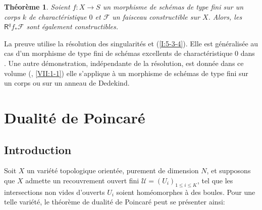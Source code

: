 \documentclass{book}
\newcommand{\cF}{\mathcal{F}}
\newcommand{\sU}{\mathscr{U}}
\newcommand{\R}{\mathsf{R}}
\newtheorem{theorem}[subsubsection]{Théorème}
\begin{document}
\begin{theorem}\label{I:5-3-7} %
Soient $f:X\to S$ un morphisme de schémas de type fini sur un corps $k$ de 
charactéristique $0$ et $\cF$ un faisceau constructible sur $X$. Alors, les 
$\R^q f_* \cF$ sont également constructibles.
\end{theorem}

La preuve utilise la résolution des singularités et (\ref{I:5-3-4}). Elle est 
généralisée au cas d'un morphisme de type fini de schémas excellents de 
charactéristique $0$ dans \cite[XIX.5]{4}. Une autre démonstration, 
indépendante de la résolution, est donnée dans ce volume 
(, \ref{VII:1-1}) 
elle s'applique à un morphisme de schémas de type fini sur un corps ou sur 
un anneau de Dedekind. 




















\section{Dualité de Poincaré}










\subsection{Introduction}\label{I:6-1}

Soit $X$ un variété topologique orientée, purement de dimension $N$, et 
supposons que $X$ admette un recouvrement ouvert fini 
$\sU=(U_i)_{1\leqslant i\leqslant K}$, tel que les intersections non vides 
d'ouverts $U_i$ soient homéomorphes à des boules. Pour une telle variété, 
le théorème de dualité de Poincaré peut se présenter ainsi: 
\end{document}
